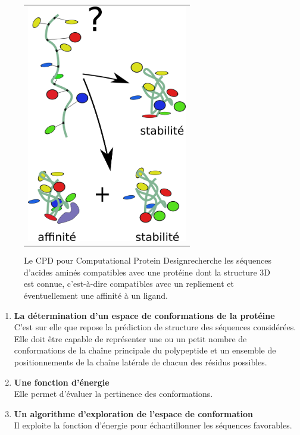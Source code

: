    \begin{figure}[!htbp]
     \centering
     \begin{tabular}{c}
       \includegraphics[width=7cm]{figure/CPD.png} &
     \end{tabular}
     
     \caption{Le CPD pour \og Computational Protein Design\fg recherche les séquences d'acides aminés compatibles avec une protéine dont la structure 3D  est connue, c'est-à-dire compatibles avec un repliement et éventuellement une affinité à un ligand.}
\label{graph:CPD}
   \end{figure}


\begin{enumerate}[leftmargin=*]

\item \textbf{La détermination d'un espace de conformations de la protéine}\\
C'est sur elle que repose la prédiction de structure des séquences considérées. Elle doit être capable de représenter une ou un petit nombre de conformations de la chaîne principale du polypeptide et un ensemble de positionnements de la chaîne latérale de chacun des résidus possibles.
\item \textbf{Une fonction d'énergie}\\
Elle permet d'évaluer la pertinence des conformations. 
\item \textbf{Un algorithme d'exploration de l'espace de conformation}\\
Il exploite la fonction d'énergie pour échantillonner les séquences favorables.
\end{enumerate}

